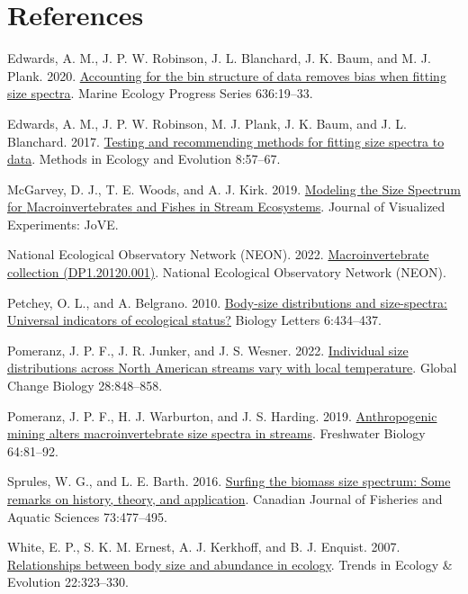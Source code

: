 \documentclass[
]{article}
\newlength{\cslhangindent}
\newlength{\cslentryspacingunit} %
\newenvironment{CSLReferences}[2] %
 {%
  \setlength{\parindent}{0pt}
  \ifodd #1
  \let\oldpar\par
  \def\par{\hangindent=\cslhangindent\oldpar}
  \fi
  \setlength{\parskip}{#2\cslentryspacingunit}
 }%
 {}
\begin{document}
\hypertarget{references}{%
\section{References}\label{references}}

\hypertarget{refs}{}
\begin{CSLReferences}{1}{0}
\leavevmode{}%
Edwards, A. M., J. P. W. Robinson, J. L. Blanchard, J. K. Baum, and M.
J. Plank. 2020. \href{https://doi.org/10.3354/meps13230}{Accounting for
the bin structure of data removes bias when fitting size spectra}.
Marine Ecology Progress Series 636:19--33.

\leavevmode{}%
Edwards, A. M., J. P. W. Robinson, M. J. Plank, J. K. Baum, and J. L.
Blanchard. 2017. \href{https://doi.org/10.1111/2041-210X.12641}{Testing
and recommending methods for fitting size spectra to data}. Methods in
Ecology and Evolution 8:57--67.

\leavevmode{}%
McGarvey, D. J., T. E. Woods, and A. J. Kirk. 2019.
\href{https://doi.org/10.3791/59945}{Modeling the {Size Spectrum} for
{Macroinvertebrates} and {Fishes} in {Stream Ecosystems}}. Journal of
Visualized Experiments: JoVE.

\leavevmode{}%
National Ecological Observatory Network (NEON). 2022.
\href{https://doi.org/10.48443/GN8X-K322}{Macroinvertebrate collection
({DP1}.20120.001)}. {National Ecological Observatory Network (NEON)}.

\leavevmode{}%
Petchey, O. L., and A. Belgrano. 2010.
\href{https://doi.org/10.1098/rsbl.2010.0240}{Body-size distributions
and size-spectra: Universal indicators of ecological status?} Biology
Letters 6:434--437.

\leavevmode{}%
Pomeranz, J. P. F., J. R. Junker, and J. S. Wesner. 2022.
\href{https://doi.org/10.1111/gcb.15862}{Individual size distributions
across {North American} streams vary with local temperature}. Global
Change Biology 28:848--858.

\leavevmode{}%
Pomeranz, J. P. F., H. J. Warburton, and J. S. Harding. 2019.
\href{https://doi.org/10.1111/fwb.13196}{Anthropogenic mining alters
macroinvertebrate size spectra in streams}. Freshwater Biology
64:81--92.

\leavevmode{}%
Sprules, W. G., and L. E. Barth. 2016.
\href{https://doi.org/10.1139/cjfas-2015-0115}{Surfing the biomass size
spectrum: Some remarks on history, theory, and application}. Canadian
Journal of Fisheries and Aquatic Sciences 73:477--495.

\leavevmode{}%
White, E. P., S. K. M. Ernest, A. J. Kerkhoff, and B. J. Enquist. 2007.
\href{https://doi.org/10.1016/j.tree.2007.03.007}{Relationships between
body size and abundance in ecology}. Trends in Ecology \& Evolution
22:323--330.

\end{CSLReferences}
\end{document}
